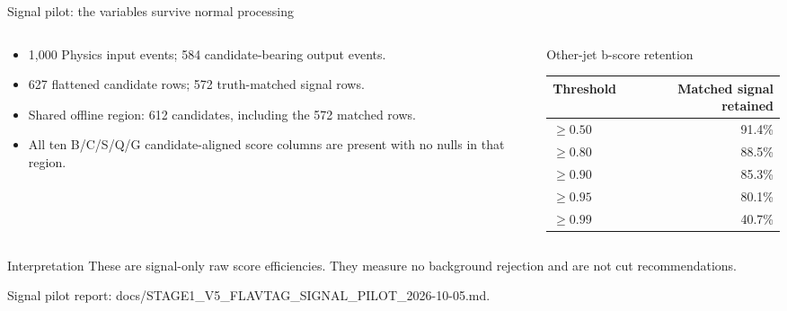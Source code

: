 \documentclass[aspectratio=169,10pt]{beamer}
\newcommand{\tinyref}[1]{\vfill\par{\tiny\color{gray}#1}}
\begin{document}
\begin{frame}{Signal pilot: the variables survive normal processing}
\begin{columns}[T]
\begin{column}{0.52\textwidth}
\begin{itemize}
  \item 1,000 Physics input events; 584 candidate-bearing output events.
  \item 627 flattened candidate rows; 572 truth-matched signal rows.
  \item Shared offline region: 612 candidates, including the 572 matched rows.
  \item All ten B/C/S/Q/G candidate-aligned score columns are present with no nulls in that region.
\end{itemize}
\end{column}
\begin{column}{0.44\textwidth}
\begin{block}{Other-jet b-score retention}
\centering
\begin{tabular}{lr}
\toprule
Threshold & Matched signal retained\\
\midrule
$\geq0.50$ & 91.4\%\\
$\geq0.80$ & 88.5\%\\
$\geq0.90$ & 85.3\%\\
$\geq0.95$ & 80.1\%\\
$\geq0.99$ & 40.7\%\\
\bottomrule
\end{tabular}
\end{block}
\end{column}
\end{columns}
\begin{alertblock}{Interpretation}
These are signal-only raw score efficiencies. They measure no background rejection and are not cut recommendations.
\end{alertblock}
\tinyref{Signal pilot report: docs/STAGE1\_V5\_FLAVTAG\_SIGNAL\_PILOT\_2026-10-05.md.}
\end{frame}
\end{document}
